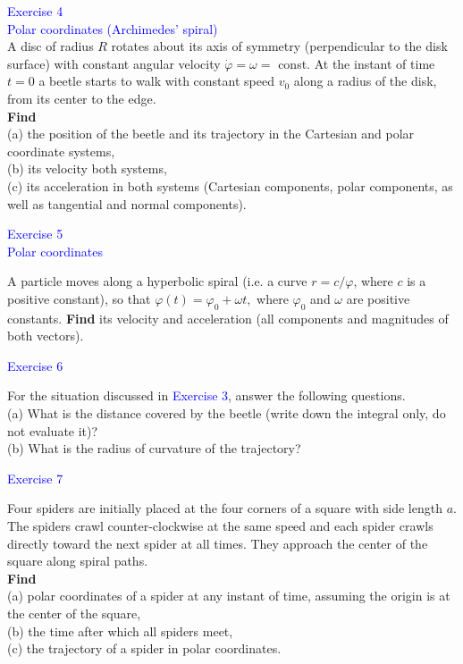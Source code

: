 \documentclass{beamer}
\begin{document}
  \begin{frame}
  \textcolor{blue}{Exercise 4}\\
  \textcolor{blue}{\footnotesize{Polar coordinates (Archimedes' spiral)}}\\
  
  A disc of radius $R$ rotates about its axis of symmetry (perpendicular to the disk
surface) with constant angular velocity $\dot{\varphi}=\omega=$ const. At the instant of time $t = 0$ a beetle starts
to walk with constant speed $v_0$ along a radius of the disk, from its center to the edge.\\
\textbf{Find}\\
  (a) the position of the beetle and its trajectory in the Cartesian and polar coordinate systems,\\
  (b) its velocity both systems,\\
  (c) its acceleration in both systems (Cartesian components, polar components, as well as tangential
  and normal components).
\end{frame}

\begin{frame}
\textcolor{blue}{Exercise 5}\\
\textcolor{blue}{\footnotesize{Polar coordinates}}

A particle moves along a hyperbolic spiral (i.e. a curve $r=c/\varphi$, where $c$ is a positive constant), so
that $\varphi(t) = \varphi_0 + \omega t,$ where $\varphi_0$ and $\omega$ are positive constants. \textbf{Find} its velocity and acceleration (all
components and magnitudes of both vectors).
\end{frame}

\begin{frame}
\textcolor{blue}{Exercise 6}

For the situation discussed in \textcolor{blue}{Exercise 3},  answer the following questions.\\
(a) What is the distance covered by the beetle (write down the integral only, do not evaluate it)?\\
(b) What is the radius of curvature of the trajectory?
\end{frame}

\begin{frame}
\textcolor{blue}{Exercise 7}

Four spiders are initially placed at the four corners of a square with side length $a$. The spiders
crawl counter-clockwise at the same speed and each spider crawls directly toward the next spider
at all times. They approach the center of the square along spiral paths.\\ \textbf{Find}\\
(a) polar coordinates of a spider at any instant of time, assuming the origin is at the center of the
square,\\
(b) the time after which all spiders meet,\\
(c) the trajectory of a spider in polar coordinates.
\end{frame}
\end{document}
